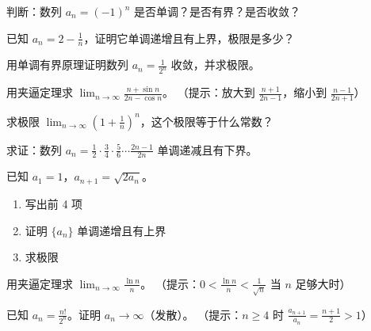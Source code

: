 \begin{exercise}[1]
判断：数列 \(a_n = (-1)^n\) 是否单调？是否有界？是否收敛？
\end{exercise}

\begin{exercise}[1]
已知 \(a_n = 2 - \frac{1}{n}\)，证明它单调递增且有上界，极限是多少？
\end{exercise}


\begin{exercise}[2]
用单调有界原理证明数列 \(a_n = \frac{1}{2^n}\) 收敛，并求极限。
\end{exercise}

\begin{exercise}[2]
用夹逼定理求 \(\displaystyle \lim_{n\to\infty} \frac{n + \sin n}{2n - \cos n}\)。
（提示：放大到 \(\frac{n+1}{2n-1}\)，缩小到 \(\frac{n-1}{2n+1}\)）
\end{exercise}

\begin{exercise}[2]
求极限 \(\displaystyle \lim_{n\to\infty} \left(1 + \frac{1}{n}\right)^n\)，这个极限等于什么常数？
\end{exercise}

\begin{exercise}[2]
求证：数列 \(a_n = \frac{1}{2} \cdot \frac{3}{4} \cdot \frac{5}{6} \cdots \frac{2n-1}{2n}\) 单调递减且有下界。
\end{exercise}


\begin{exercise}[3]
已知 \(a_1 = 1\)，\(a_{n+1} = \sqrt{2a_n}\)。
\begin{enumerate}
  \item[(1)] 写出前 4 项
  \item[(2)] 证明 \(\{a_n\}\) 单调递增且有上界
  \item[(3)] 求极限
\end{enumerate}
\end{exercise}

\begin{exercise}[3]
用夹逼定理求 \(\displaystyle \lim_{n\to\infty} \frac{\ln n}{n}\)。
（提示：\(0 < \frac{\ln n}{n} < \frac{1}{\sqrt{n}}\) 当 \(n\) 足够大时）
\end{exercise}

\begin{exercise}[3]
已知 \(a_n = \frac{n!}{2^n}\)。证明 \(a_n \to \infty\)（发散）。
（提示：\(n \ge 4\) 时 \(\frac{a_{n+1}}{a_n} = \frac{n+1}{2} > 1\)）
\end{exercise}

